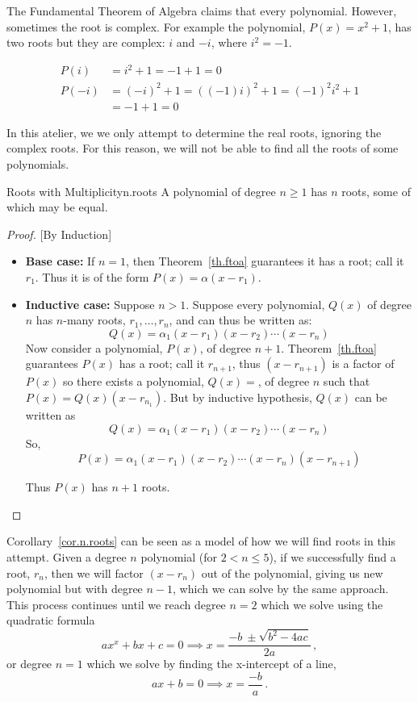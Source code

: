 The Fundamental Theorem of Algebra claims that every polynomial.  However, sometimes the root is complex.
For example the polynomial, $P(x) = x^2 + 1$, has two roots but they are complex: $i$ and $-i$, where $i^2= -1$.

\begin{align*}
  P(i) &= i^2 + 1 = -1 + 1 = 0\\[3pt]
  P(-i) &= (-i)^2 + 1 = ((-1)i)^2 + 1 = (-1)^2i^2 + 1 \\
  &= -1 + 1 = 0
\end{align*}

In this atelier, we we only attempt to determine the real roots, ignoring the complex roots.
For this reason, we will not be able to find all the roots of some polynomials.

\begin{corollary}{Roots with Multiplicity}{n.roots}
  A polynomial of degree $n\ge 1$ has $n$ roots, some of which may be equal.
\end{corollary}
\begin{proof}

  [By Induction]
  
  \begin{itemize}
    
  \item \textbf{Base case:} If $n=1$, then Theorem~\ref{th.ftoa}
    guarantees it has a root; call it $r_1$.  Thus it is of the form
    $P(x)=\alpha (x-r_1)$.
  \item \textbf{Inductive case:} Suppose $n>1$.  Suppose every polynomial, $Q(x)$ of degree
    $n$ has $n$-many roots, $r_1,\ldots,r_n$, and can thus be written as:
    \[Q(x) = \alpha_1 (x - r_1) (x - r_2) \cdots (x - r_n)\]
    Now consider a polynomial, $P(x)$, of
    degree $n+1$.  Theorem~\ref{th.ftoa} guarantees $P(x)$ has a root;
    call it $r_{n+1}$, thus $(x-r_{n+1})$ is a factor of $P(x)$ so there
    exists a polynomial, $Q(x)=$, of degree $n$ such that
    $P(x) =  Q(x) (x-r_{n_1})$.
    But by inductive hypothesis, $Q(x)$ can be written
    as \[Q(x) = \alpha_1 (x - r_1) (x - r_2) \cdots (x - r_n)\]
    So, \[P(x) = \alpha_1 (x - r_1) (x - r_2) \cdots (x - r_n) (x-r_{n+1})\]

    Thus $P(x)$ has $n+1$ roots.
  \end{itemize}
\end{proof}

Corollary~\ref{cor.n.roots} can be seen as a model of how we will find
roots in this attempt.  Given a degree $n$ polynomial (for $2<n\leq
5$), if we successfully find a root, $r_n$, then we will factor
$(x-r_n)$ out of the polynomial, giving us new polynomial but with
degree $n-1$, which we can solve by the same approach.  This process
continues until we reach degree $n=2$ which we solve using the
quadratic formula
\[ a x^x + b x + c = 0 \implies x = \frac{-b~ \pm \sqrt{b^2 - 4a c}}{2a}\,,\] or
degree $n=1$ which we solve by finding the x-intercept of a line,
\[ a x + b = 0 \implies x=\frac{-b}{a}\,.\]
